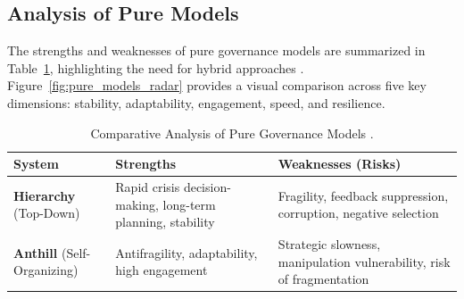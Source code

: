 \documentclass[11pt,a4paper]{article}
\begin{document}
\begin{small}
\section{Analysis of Pure Models}
The strengths and weaknesses of pure governance models are summarized in Table~\ref{tab:pure_models}, highlighting the need for hybrid approaches \citep[lines 2262]{HybridModelsMemo}. Figure~\ref{fig:pure_models_radar} provides a visual comparison across five key dimensions: stability, adaptability, engagement, speed, and resilience.

\begin{table}[h!]
\centering
\caption{Comparative Analysis of Pure Governance Models \citep{HybridModelsMemo}.}
\label{tab:pure_models}
\begin{tabular}{@{}p{3cm}p{5.5cm}p{5.5cm}@{}}
\toprule
\textbf{System} & \textbf{Strengths} & \textbf{Weaknesses (Risks)} \\ 
\midrule
\textbf{Hierarchy} (Top-Down) & Rapid crisis decision-making, long-term planning, stability & Fragility, feedback suppression, corruption, negative selection \\
\addlinespace
\textbf{Anthill} (Self-Organizing) & Antifragility, adaptability, high engagement & Strategic slowness, manipulation vulnerability, risk of fragmentation \\ 
\bottomrule
\end{tabular}
\end{table}

\begin{figure}[h!]
\centering
{}
\end{figure}
\end{small}
\end{document}
